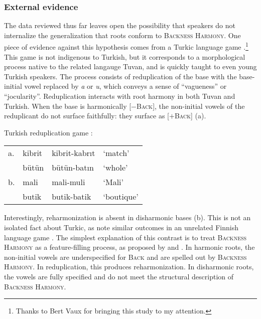 \subsubsection{External evidence}

The data reviewed thus far leaves open the possibility that speakers do not internalize the generalization that roots conform to \textsc{Backness Harmony}. One piece of evidence against this hypothesis comes from a Turkic language game \citep{Harrison2001}.\footnote{Thanks to Bert Vaux for bringing this study to my attention.} This game is not indigenous to Turkish, but it corresponds to a morphological process native to the related langauge Tuvan, and is quickly taught to even young Turkish speakers. The process consists of reduplication of the base with the base-initial vowel replaced by \emph{a} or \emph{u}, which conveys a sense of ``vagueness'' or ``jocularity''. Reduplication interacts with root harmony in both Tuvan and Turkish. When the base is harmonically [$-$\textsc{Back}], the non-initial vowels of the reduplicant do not surface faithfully: they surface as [$+$\textsc{Back}] (\nextx a).

\ex Turkish reduplication game \citep[][231]{Harrison2001}: \\
\begin{tabular}{l l l l}
a. & kibrit & kibrit-kabrıt & `match'    \\
   & bütün  & bütün-batın   & `whole'    \\
b. & mali   & mali-muli     & `Mali'     \\
   & butik  & butik-batik   & `boutique' \\
\end{tabular} \xe

\noindent
Interestingly, reharmonization is absent in disharmonic bases (\lastx b). This is not an isolated fact about Turkic, as \citeauthor{Harrison2001} note similar outcomes in an unrelated Finnish language game \citep{Campbell1986}. The simplest explanation of this contrast is to treat \textsc{Backness Harmony} as a feature-filling process, as proposed by \citet{Clements1982} and \citet{Inkelas1997}. In harmonic roots, the non-initial vowels are underspecified for \textsc{Back} and are spelled out by \textsc{Backness Harmony}. In reduplication, this produces reharmonization. In disharmonic roots, the vowels are fully specified and do not meet the structural description of \textsc{Backness Harmony}. 

